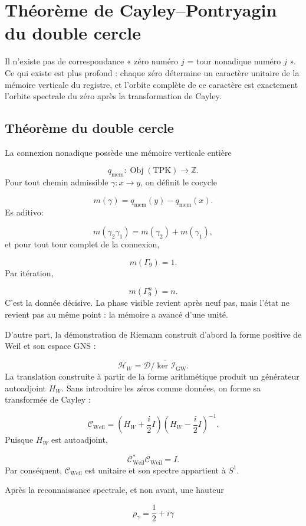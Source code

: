 \section{Théorème de Cayley–Pontryagin du double cercle}
Il n'existe pas de correspondance « zéro numéro \(j\) = tour nonadique numéro \(j\) ». Ce qui existe est plus profond : chaque zéro détermine un caractère unitaire de la mémoire verticale du registre, et l'orbite complète de ce caractère est exactement l'orbite spectrale du zéro après la transformation de Cayley.\par
{}
\subsection{Théorème du double cercle}
La connexion nonadique possède une mémoire verticale entière\par
\[
q_{\mathrm{mem}}:\operatorname{Obj}(\mathrm{TPK})\longrightarrow\mathbb Z.
\]
Pour tout chemin admissible \(\gamma:x\to y\), on définit le cocycle\par
\[
m(\gamma)
=
q_{\mathrm{mem}}(y)-q_{\mathrm{mem}}(x).
\]
Es aditivo:\par
\[
m(\gamma_2\gamma_1)
=
m(\gamma_2)+m(\gamma_1),
\]
et pour tout tour complet de la connexion,\par
\[
m(\Gamma_9)=1.
\]
Par itération,\par
\[
m(\Gamma_9^n)=n.
\]
C'est la donnée décisive. La phase visible revient après neuf pas, mais l'état ne revient pas au même point : la mémoire a avancé d'une unité.\par
D'autre part, la démonstration de Riemann construit d'abord la forme positive de Weil et son espace GNS :\par
\[
\mathcal H_W
=
\overline{\mathcal D/\ker \mathscr I_{\mathrm{GW}}}.
\]
La translation construite à partir de la forme arithmétique produit un générateur autoadjoint \(H_W\). Sans introduire les zéros comme données, on forme sa transformée de Cayley :\par
\[
\mathcal C_{\mathrm{Weil}}
=
\left(H_W+\frac{i}{2}I\right)
\left(H_W-\frac{i}{2}I\right)^{-1}.
\]
Puisque \(H_W\) est autoadjoint,\par
\[
\mathcal C_{\mathrm{Weil}}^*
\mathcal C_{\mathrm{Weil}}=I.
\]
Par conséquent, \(\mathcal C_{\mathrm{Weil}}\) est unitaire et son spectre appartient à \(S^1\).\par
Après la reconnaissance spectrale, et non avant, une hauteur\par
\[
\rho_\gamma=\frac12+i\gamma
\]
